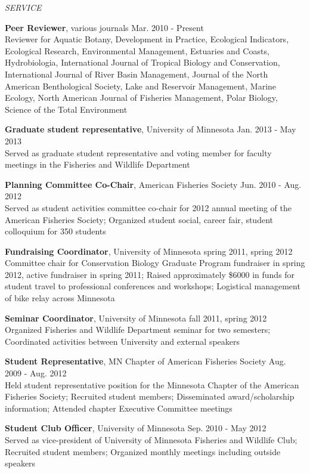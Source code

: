 \documentclass[letterpaper,12pt]{article}
\newcommand{\sectitle}[1]{\vspace{\baselineskip} \centerline{\large{\textit{#1}}}}
\begin{document}
\sectitle{SERVICE}

{\bf Peer Reviewer}, various journals \hfill Mar. 2010 - Present \\
Reviewer for Aquatic Botany, Development in Practice, Ecological Indicators, Ecological Research, Environmental Management, Estuaries and Coasts, Hydrobiologia, International Journal of Tropical Biology and Conservation, International Journal of River Basin Management, Journal of the North American Benthological Society, Lake and Reservoir Management, Marine Ecology, North American Journal of Fisheries Management, Polar Biology, Science of the Total Environment

{\bf Graduate student representative}, University of Minnesota \hfill Jan. 2013 - May 2013 \\
Served as graduate student representative and voting member for faculty meetings in the Fisheries and Wildlife Department

{\bf Planning Committee Co-Chair}, American Fisheries Society \hfill Jun. 2010 - Aug. 2012 \\
Served as student activities committee co-chair for 2012 annual meeting of the American Fisheries Society; Organized student social, career fair, student colloquium for 350 students

{\bf Fundraising Coordinator}, University of Minnesota \hfill spring 2011, spring 2012 \\
Committee chair for Conservation Biology Graduate Program fundraiser in spring 2012, active fundraiser in spring 2011; Raised approximately \$6000 in funds for student travel to professional conferences and workshops; Logistical management of bike relay across Minnesota

{\bf Seminar Coordinator}, University of Minnesota \hfill fall 2011, spring 2012 \\
Organized Fisheries and Wildlife Department seminar for two semesters; Coordinated activities between University and external speakers

{\bf Student Representative}, MN Chapter of American Fisheries Society \hfill Aug. 2009 - Aug. 2012 \\
Held student representative position for the Minnesota Chapter of the American Fisheries Society; Recruited student members; Disseminated award/scholarship information; Attended chapter Executive Committee meetings

{\bf Student Club Officer}, University of Minnesota \hfill Sep. 2010 - May 2012 \\
Served as vice-president of University of Minnesota Fisheries and Wildlife Club; Recruited student members; Organized monthly meetings including outside speakers
\end{document}
